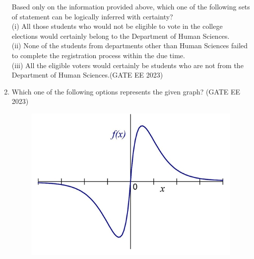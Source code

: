 \documentclass[a4paper,12pt]{exam}
\theoremstyle{remark}
\begin{document}
\begin{enumerate}
Based only on the information provided above, which one of the following sets of statement can be logically inferred with certainty? \\
(i) All those students who would not be eligible to vote in the college elections would certainly belong to the Department of Human Sciences. \\
(ii) None of the students from departments other than Human Sciences failed to complete the registration process within the due time. \\
(iii) All the eligible voters would certainly be students who are not from the Department of Human Sciences.\hfill{(GATE EE 2023)}

\begin{enumerate}
\end{enumerate}

\item Which one of the following options represents the given graph? \hfill{(GATE EE 2023)}
\begin{figure}[h]
    \centering
    \includegraphics[width=0.4\columnwidth]{figs/Screenshot_17-8-2025_203313_.jpeg}
    \caption{}
    \label{fig:placeholder}
\end{figure}


\begin{enumerate}
\end{enumerate}


\end{enumerate}
\end{document}
